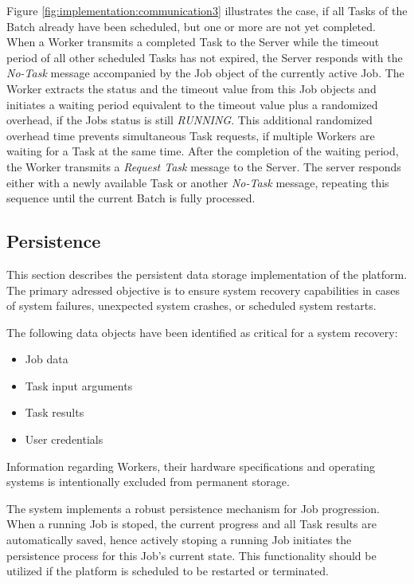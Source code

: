 Figure \ref{fig:implementation:communication3} illustrates the case, if all Tasks of the Batch already have been scheduled, but one or more are not yet completed. When a Worker transmits a completed Task to the Server while the timeout period of all other scheduled Tasks has not expired, the Server responds with the \emph{No-Task} message accompanied by the Job object of the currently active Job. The Worker extracts the status and the timeout value from this Job objects and initiates a waiting period equivalent to the timeout value plus a randomized overhead, if the Jobs status is still \emph{RUNNING}. This additional randomized overhead time prevents simultaneous Task requests, if multiple Workers are waiting for a Task at the same time. After the completion of the waiting period, the Worker transmits a \emph{Request Task} message to the Server. The server responds either with a newly available Task or another \emph{No-Task} message, repeating this sequence until the current Batch is fully processed.

\subsection{Persistence}
\label{subsec:implementation:architecture:persistence}
This section describes the persistent data storage implementation of the platform. The primary adressed objective is to ensure system recovery capabilities in cases of system failures, unexpected system crashes, or scheduled system restarts.

The following data objects have been identified as critical for a system recovery:
\clearpage
\begin{itemize}
    \item Job data
    \item Task input arguments
    \item Task results
    \item User credentials
\end{itemize}
Information regarding Workers, their hardware specifications and operating systems is intentionally excluded from permanent storage.

The system implements a robust persistence mechanism for Job progression. When a running Job is stoped, the current progress and all Task results are automatically saved, hence actively stoping a running Job initiates the persistence process for this Job's current state. This functionality should be utilized if the platform is scheduled to be restarted or terminated.

